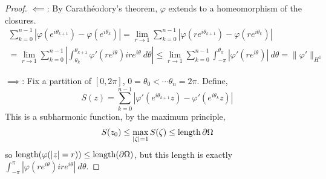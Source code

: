 \begin{proof}
	$\impliedby$:
	By Carathéodory's theorem, $\varphi$ extends to a homeomorphism of the closures.
	\begin{multline*}
		\sum_{k = 0}^{n - 1} |\varphi(e^{i \theta_{k + 1}}) - \varphi(e^{i \theta_k})|
		= \lim_{r \to 1} \sum_{k = 0}^{n - 1} |\varphi(r e^{i \theta_{k + 1}}) - \varphi(r e^{i \theta_k})| \\
		= \lim_{r \to 1} \sum_{k = 0}^{n - 1} \left\lvert \int_{\theta_k}^{\theta_{k + 1}} \varphi'(r e^{i \theta}) i r e^{i \theta}\ d \theta \right\rvert
		\le \lim_{r \to 1} \sum_{k = 0}^{n - 1} \int_{-\pi}^{\theta_{\pi}} |\varphi'(r e^{i \theta})|\ d \theta
		= \lVert \varphi' \rVert_{H^1}
	\end{multline*}

	$\implies$:
	Fix a partition of $[0, 2 \pi]$, $0 = \theta_0 < \cdots \theta_n = 2 \pi$.
	Define,
	\[
		S(z)
		= \sum_{k = 0}^{n - 1} |\varphi'(e^{i \theta_{k + 1}} z) - \varphi'(e^{i \theta_k} z)| 
	\]
	This is a subharmonic function, by the maximum principle,
	\[
		S(z_{0})
		\le \max_{|\zeta| = 1} S(\zeta)
		\le \operatorname{length} \partial \Omega
	\]
	so $\operatorname{length}(\varphi(|z| = r)) \le \operatorname{length}(\partial \Omega)$, but this length is exactly $\int_{-\pi}^{\pi} |\varphi(r e^{i \theta}) i r e^{i \theta}|\ d \theta$.
\end{proof}

